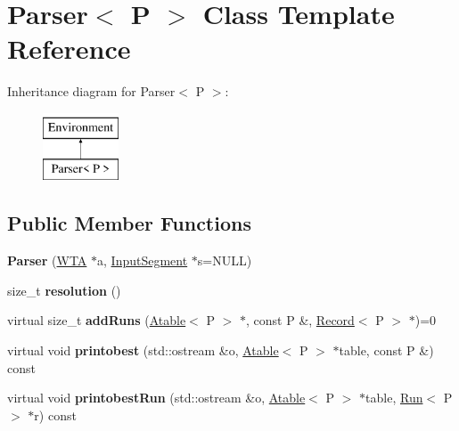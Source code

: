 \hypertarget{classParser}{}\section{Parser$<$ P $>$ Class Template Reference}
\label{classParser}
Inheritance diagram for Parser$<$ P $>$\+:\begin{figure}[H]
\begin{center}
\leavevmode
\includegraphics[height=2.000000cm]{classParser}
\end{center}
\end{figure}
\subsection*{Public Member Functions}
\begin{DoxyCompactItemize}
\item 
\mbox{\label{classParser_a7e5b1a5452fb9eb39040d10adec713bb}} 
{\bfseries Parser} (\mbox{\hyperlink{classWTA}{W\+TA}} $\ast$a, \mbox{\hyperlink{classInputSegment}{Input\+Segment}} $\ast$s=N\+U\+LL)
\item 
\mbox{\label{classParser_a0f3f9620883bb10e9ecd07cec155b1a3}} 
size\+\_\+t {\bfseries resolution} ()
\item 
\mbox{\label{classParser_a1036f9fa453e662cb87c882978af0f9f}} 
virtual size\+\_\+t {\bfseries add\+Runs} (\mbox{\hyperlink{classAtable}{Atable}}$<$ P $>$ $\ast$, const P \&, \mbox{\hyperlink{classRecord}{Record}}$<$ P $>$ $\ast$)=0
\item 
\mbox{\label{classParser_a36e89e4e76b8ba144b764cf07d02ca75}} 
virtual void {\bfseries printobest} (std\+::ostream \&o, \mbox{\hyperlink{classAtable}{Atable}}$<$ P $>$ $\ast$table, const P \&) const
\item 
\mbox{\label{classParser_ae0a82cabf61977d6a0f0bc618c64e6c8}} 
virtual void {\bfseries printobest\+Run} (std\+::ostream \&o, \mbox{\hyperlink{classAtable}{Atable}}$<$ P $>$ $\ast$table, \mbox{\hyperlink{classRun}{Run}}$<$ P $>$ $\ast$r) const
\end{DoxyCompactItemize}
